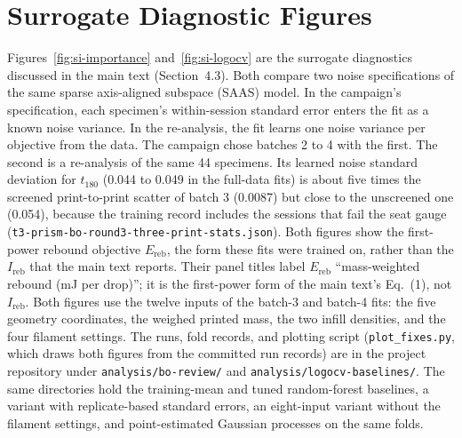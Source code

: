 \documentclass[11pt]{article}
\begin{document}
\section{Surrogate Diagnostic Figures}
\label{si:surrogate}
Figures~\ref{fig:si-importance} and~\ref{fig:si-logocv} are the surrogate
diagnostics discussed in the main text (Section~4.3). Both compare two noise
specifications of the same sparse axis-aligned subspace (SAAS) model. In the
campaign's specification, each specimen's within-session standard error
enters the fit as a known noise variance. In the re-analysis, the fit learns
one noise variance per objective from the data. The campaign chose batches
2 to 4 with the first. The second is a re-analysis of the same 44 specimens. Its learned
noise standard deviation for $t_{180}$ (0.044 to 0.049 in the full-data
fits) is about five times the screened print-to-print scatter of batch 3
(0.0087) but close to the unscreened one (0.054), because the training
record includes the sessions that fail the seat gauge
(\texttt{t3-prism-bo-round3-three-print-stats.json}). Both figures show the first-power rebound objective $E_{\mathrm{reb}}$, the form these fits were trained on, rather than the $I_{\mathrm{reb}}$ that the main text reports. Their panel titles label $E_{\mathrm{reb}}$ ``mass-weighted rebound (mJ per drop)''; it is the first-power form of the main text's Eq.~(1), not $I_{\mathrm{reb}}$.
Both figures use the twelve inputs of the batch-3 and batch-4 fits: the five
geometry coordinates, the weighed printed mass, the two infill densities, and
the four filament settings. The runs, fold records, and plotting script
(\texttt{plot\_fixes.py}, which draws both figures from the committed run
records) are in the project repository under
\texttt{analysis/\allowbreak bo-review/} and
\texttt{analysis/\allowbreak logocv-baselines/}. The same directories hold
the training-mean and tuned random-forest baselines, a variant with
replicate-based standard errors, an eight-input variant without the
filament settings, and point-estimated Gaussian processes on the same folds.
\end{document}

